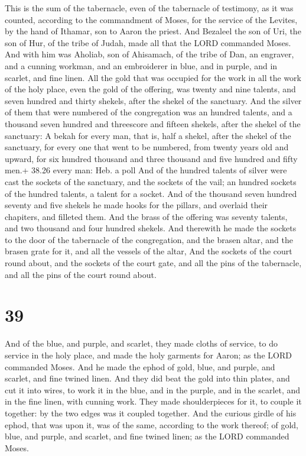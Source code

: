  This is the sum of the tabernacle, even of the
tabernacle of testimony, as it was counted, according to the commandment
of Moses, for the service of the Levites, by the hand of Ithamar, son to
Aaron the priest.  And Bezaleel the son of Uri, the son of
Hur, of the tribe of Judah, made all that the LORD commanded Moses.
 And with him was Aholiab, son of Ahisamach, of the tribe
of Dan, an engraver, and a cunning workman, and an embroiderer in blue,
and in purple, and in scarlet, and fine linen.  All the
gold that was occupied for the work in all the work of the holy place,
even the gold of the offering, was twenty and nine talents, and seven
hundred and thirty shekels, after the shekel of the sanctuary.
 And the silver of them that were numbered of the
congregation was an hundred talents, and a thousand seven hundred and
threescore and fifteen shekels, after the shekel of the sanctuary:
 A bekah for every man, that is, half a shekel, after the
shekel of the sanctuary, for every one that went to be numbered, from
twenty years old and upward, for six hundred thousand and three thousand
and five hundred and fifty men.+ 38.26 every man: Heb. a poll
 And of the hundred talents of silver were cast the sockets
of the sanctuary, and the sockets of the vail; an hundred sockets of the
hundred talents, a talent for a socket.  And of the
thousand seven hundred seventy and five shekels he made hooks for the
pillars, and overlaid their chapiters, and filleted them. 
And the brass of the offering was seventy talents, and two thousand and
four hundred shekels.  And therewith he made the sockets to
the door of the tabernacle of the congregation, and the brasen altar,
and the brasen grate for it, and all the vessels of the altar,
 And the sockets of the court round about, and the sockets
of the court gate, and all the pins of the tabernacle, and all the pins
of the court round about.

\hypertarget{section-38}{%
\section{39}\label{section-38}}

 And of the blue, and purple, and scarlet, they made cloths
of service, to do service in the holy place, and made the holy garments
for Aaron; as the LORD commanded Moses.  And he made the
ephod of gold, blue, and purple, and scarlet, and fine twined linen.
 And they did beat the gold into thin plates, and cut it
into wires, to work it in the blue, and in the purple, and in the
scarlet, and in the fine linen, with cunning work.  They
made shoulderpieces for it, to couple it together: by the two edges was
it coupled together.  And the curious girdle of his ephod,
that was upon it, was of the same, according to the work thereof; of
gold, blue, and purple, and scarlet, and fine twined linen; as the LORD
commanded Moses.


